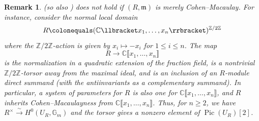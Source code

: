 \documentclass[11pt, reqno]{amsart}
\newcommand{\bC}{\mathbb{C}}
\newcommand{\bG}{\mathbb{G}}
\newcommand{\bZ}{\mathbb{Z}}
\newcommand{\cH}{\mathcal{H}}
\newcommand{\fm}{\mathfrak{m}}
\newcommand{\sO}{\mathscr{O}}
\DeclareMathOperator{\Pic}{Pic}		%
\DeclareMathOperator{\Res}{Res}		%
\newcommand{\ce}{\colonequals}
\newcommand{\et}{\mathrm{\acute{e}t}}	%
\newcommand{\isomto}{\overset{\sim}{\longrightarrow}}
\newcommand{\llb}{\llbracket}			%
\newcommand{\ra}{\rightarrow}
\newcommand{\Ra}{\Rightarrow}
\newcommand{\rrb}{\rrbracket}			%
\newcommand{\tors}{\mathrm{tors}}		%
\newcommand{\x}{\text}
\newcommand{\q}{\quad}
\newcommand{\be}{\begin{equation}}
\newcommand{\ee}{\end{equation}}
\newcommand{\brem}{\begin{rem}}
\newcommand{\erem}{\end{rem}}
\numberwithin{equation}{numberingbase}
\theoremstyle{thms}
\theoremstyle{claims}
\theoremstyle{defs}
\newtheorem{rem}[numberingbase]{Remark}
\theoremstyle{thms}
\theoremstyle{defs}
\theoremstyle{subsection-tweak}
\theoremstyle{subsection-tweak}
\begin{document}

\brem \label{no-free-lunch}
 (so also ) does not hold if $(R, \fm)$ is merely Cohen--Macaulay. For instance, consider the normal local domain
\[
R \ce (\bC\llb x_1, \dotsc, x_n\rrb)^{\bZ/2\bZ}
\]
where the $\bZ/2\bZ$-action is given by $x_i \mapsto -x_i$ for $1 \le i \le n$. 
The map 
\[
R \ra \bC\llb x_1, \dotsc, x_n\rrb
\]
is the normalization in a quadratic extension of the fraction field, is a nontrivial $\bZ/2\bZ$-torsor away from the maximal ideal, and is an inclusion of an $R$-module direct summand (with the antiinvariants as a complementary summand). In particular, a system of parameters for $R$ is also one for $\bC\llb x_1, \dotsc, x_n\rrb$, and $R$ inherits Cohen--Macaulayness from $\bC\llb x_1, \dotsc, x_n\rrb$. 
Thus, for $n \ge 2$, we have $R^\times \isomto H^0(U_R, \bG_m)$ and the torsor gives a nonzero element of $\Pic(U_R)[2]$.
\erem
\end{document}
